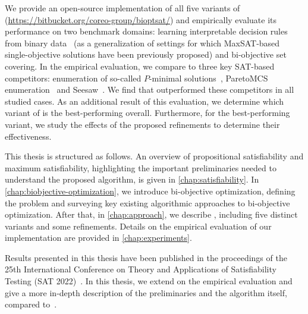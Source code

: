 We provide an open-source implementation of all five variants of \algname{} ({\small\url{https://bitbucket.org/coreo-group/bioptsat/}}) and empirically evaluate its performance on two benchmark domains:
learning interpretable decision rules from binary data~\autocite{DBLP:conf/cp/MaliotovM18} (as a generalization of settings for which MaxSAT-based single-objective solutions have been previously proposed) and bi-objective set covering.
In the empirical evaluation, we compare \algname{} to three key SAT-based competitors:
enumeration of so-called $P$-minimal solutions~\autocite{DBLP:conf/cp/SohBTB17}, ParetoMCS enumeration~\autocite{DBLP:conf/ijcai/Terra-NevesLM18a} and Seesaw~\autocite{DBLP:conf/cp/JanotaMSM21}.
We find that \algname{} outperformed these competitors in all studied cases.
As an additional result of this evaluation, we determine which variant of \algname{} is the best-performing overall.
Furthermore, for the best-performing variant, we study the effects of the proposed refinements to determine their effectiveness.

This thesis is structured as follows.
An overview of propositional satisfiability and maximum satisfiability, highlighting the important preliminaries needed to understand the proposed algorithm, is given in \cref{chap:satisfiability}.
In \cref{chap:biobjective-optimization}, we introduce bi-objective optimization, defining the problem and surveying key existing algorithmic approaches to bi-objective optimization.
After that, in \cref{chap:approach}, we describe \algname{}, including five distinct variants and some refinements.
Details on the empirical evaluation of our implementation are provided in \cref{chap:experiments}.

Results presented in this thesis have been published in the proceedings of the 25th International Conference on Theory and Applications of Satisfiability Testing (SAT 2022)~\autocite{JabsEtAl2022MaxSATBasedBi}.
In this thesis, we extend on the empirical evaluation and give a more in-depth description of the preliminaries and the algorithm itself, compared to~\autocite{JabsEtAl2022MaxSATBasedBi}.